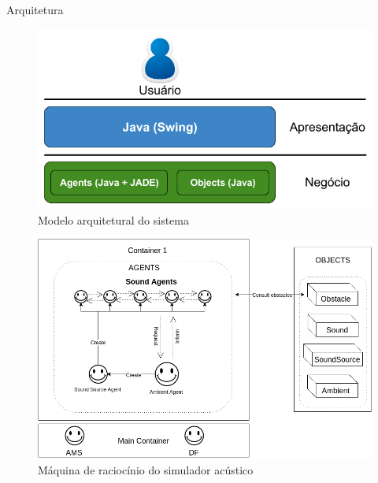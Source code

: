 \begin{frame}[allowframebreaks]{Arquitetura}

  \begin{figure}[t]
    \centering
    \includegraphics[height=\dimexpr8\textheight/14\relax]{figuras/arquitetura_geral}
    \caption{Modelo arquitetural do sistema}
  \end{figure}



  \begin{figure}[t]
    \centering
    \includegraphics[height=\dimexpr9\textheight/14\relax]{figuras/arquitetura}
    \caption{Máquina de raciocínio do simulador acústico}
  \end{figure}

\end{frame}

